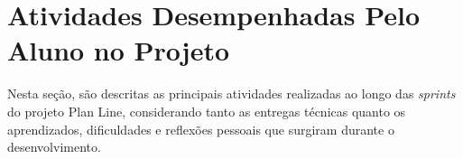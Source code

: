 \clearpage
\section[Atividades Desempenhadas Pelo Aluno no Projeto]{Atividades Desempenhadas Pelo Aluno no Projeto}

Nesta seção, são descritas as principais atividades realizadas ao longo das \textit{sprints} do projeto Plan Line, considerando tanto as entregas técnicas quanto os aprendizados, dificuldades e reflexões pessoais que surgiram durante o desenvolvimento.






